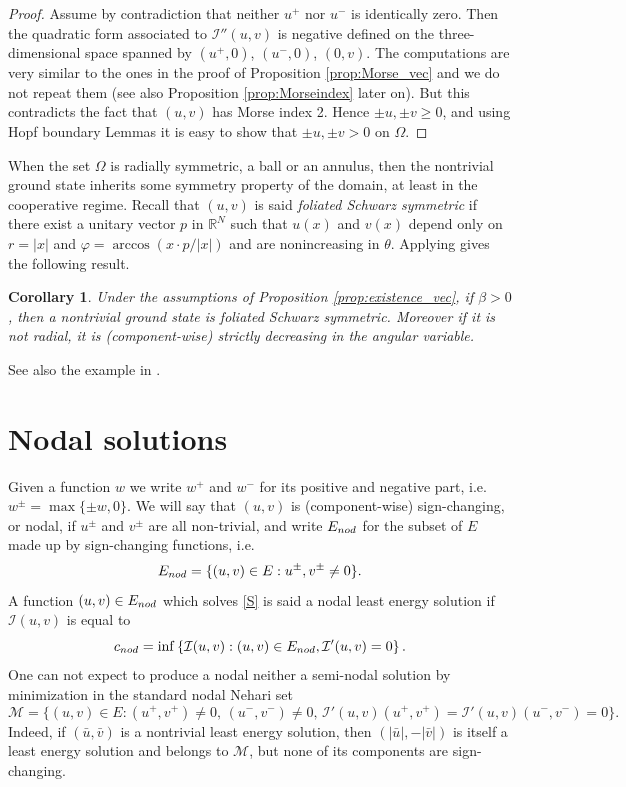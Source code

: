 \documentclass[10pt,a4paper]{amsart}
\numberwithin{equation}{section}
\newtheorem{corollary}[theo]{Corollary}
\begin{document}
\begin{proof}
Assume by contradiction that neither $u^+$ nor $u^-$ is identically zero.
Then the quadratic form associated to $\mathcal I''(u,v)$ is negative defined on
the three-dimensional space spanned by $(u^+, 0)$, $(u^-, 0)$, $(0,v)$.
The computations are very similar to the ones in the proof of Proposition
\ref{prop:Morse_vec} and we do not repeat them (see also Proposition
\ref{prop:Morseindex} later on). But this contradicts the fact that $(u,v)$ has
Morse index 2.
Hence $\pm u, \pm v \ge 0$, and using Hopf boundary Lemmas it is easy to show that
$\pm u, \pm v >0$  on $\Omega$.
\end{proof}

When the set  $\Omega$ is radially symmetric, a ball or an annulus, then the
nontrivial ground state inherits some symmetry property of the domain, at least in
the cooperative regime.
Recall that $(u,v)$ is said \emph{foliated Schwarz symmetric} if there exist a
unitary vector $p$ in $\mathbb{R}^N$ such that $u(x)$ and $v(x)$ depend only on $r = |x|$ and
$\varphi = \arccos (x\cdot p /|x|)$ and are nonincreasing in $\theta$.
Applying \cite[Theorem 1.1]{DamPac} gives the following result.

\begin{corollary}\label{cor:foliated}
Under the assumptions of Proposition \ref{prop:existence_vec}, if $\beta > 0$,
then a  nontrivial ground state is  foliated Schwarz symmetric.
Moreover if it is not radial, it is (component-wise) strictly decreasing in the
angular variable.
\end{corollary}

See also the example in \cite[Section 4]{DamPac}.

\section{Nodal solutions}\label{sec2}

Given a function $w$ we write $w^+$ and $w^-$ for its positive and negative part,
i.e. $w^{\pm}=\max\{\pm w, 0\}$.
We will say that $(u,v)$ is  (component-wise) sign-changing, or nodal,
if $u^{\pm}$ and $v^{\pm}$ are all non-trivial, and
write $E_{\rm nod}$ for the subset of $E$ made up by sign-changing functions, i.e.
\[
E_{\rm nod} = \{(u,v) \in E : u^{\pm},v^{\pm}\neq0\}.
\]
A function $(u,v)\in E_{\rm nod}$ which solves \eqref{S} is said a nodal least energy
solution if $\mathcal I(u,v)$ is equal to
\[
c_{\rm nod}= \inf \left\{ \mathcal I(u,v) : (u,v)\in E_{\rm nod},
 \mathcal I'(u,v) =0\right\}.
\]
One can not expect to produce a nodal neither a semi-nodal  solution by minimization
in the  standard nodal Nehari set
\[
\mathcal M = \{ (u,v)\in E : (u^+,v^+)\neq 0, \, (u^-,v^-)\neq 0, \,
 \mathcal I'(u,v)(u^+,v^+)= \mathcal I'(u,v) (u^- ,v^-)=0\} .
 \]
Indeed, if $(\bar u, \bar v)$ is a nontrivial least energy solution, then
$(|\bar u| , -|\bar v|)$ is itself a least energy solution and belongs  to $\mathcal M$,
but none of  its components are sign-changing.
\end{document}
